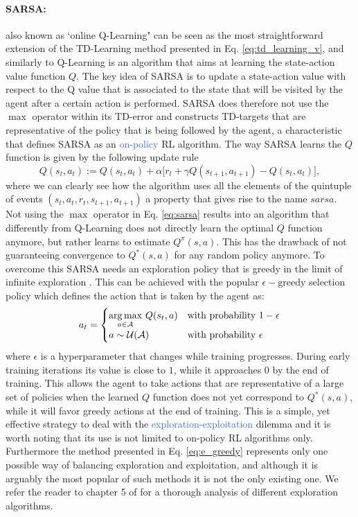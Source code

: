\paragraph{SARSA:} also known as `online Q-Learning" \cite{rummery1994line} can be seen as the most straightforward extension of the TD-Learning method presented in Eq. \ref{eq:td_learning_v}, and similarly to Q-Learning is an algorithm that aims at learning the state-action value function $Q$. The key idea of SARSA is to update a state-action value with respect to the Q value that is associated to the state that will be visited by the agent after a certain action is performed. SARSA does therefore not use the $\max$ operator within its TD-error and constructs TD-targets that are representative of the policy that is being followed by the agent, a characteristic that defines SARSA as an \textcolor{RoyalBlue}{on-policy} RL algorithm. The way SARSA learns the $Q$ function is given by the following update rule
\begin{equation}
	Q(s_t,a_t):=Q(s_t,a_t) + \alpha\big[r_t + \gamma Q(s_{t+1},a_{t+1}) - Q(s_t, a_t) \big], 
	\label{eq:sarsa}
\end{equation}
where we can clearly see how the algorithm uses all the elements of the quintuple of events $(s_t, a_t, r_t, s_{t+1}, a_{t+1})$ a property that gives rise to the name $sarsa$. Not using the $\max$ operator in Eq. \ref{eq:sarsa} results into an algorithm that differently from Q-Learning does not directly learn the optimal $Q$ function anymore, but rather learns to estimate $Q^{\pi}(s,a)$. This has the drawback of not guaranteeing convergence to $Q^{*}(s,a)$ for any random policy anymore. To overcome this SARSA needs an exploration policy that is greedy in the limit of infinite exploration \cite{singh2000convergence}. This can be achieved with the popular $\epsilon-\text{greedy}$ selection policy which defines the action that is taken by the agent as:
\begin{equation}
a_t = \begin{cases}
\underset{a\in\mathcal{A}}{\operatorname*{arg\,max}} \ Q(s_t,a) &\text{with probability $1-\epsilon$}\\
a \sim \mathcal{U}(\mathcal{A}) &\text{with probability $\epsilon$}
\end{cases}
\label{eq:e_greedy}
\end{equation}
where $\epsilon$ is a hyperparameter that changes while training progresses. During early training iterations its value is close to $1$, while it approaches $0$ by the end of training. This allows the agent to take actions that are representative of a large set of policies when the learned $Q$ function does not yet correspond to $Q^{*}(s,a)$, while it will favor greedy actions at the end of training. This is a simple, yet effective strategy to deal with the \textcolor{RoyalBlue}{exploration-exploitation} dilemma and it is worth noting that its use is not limited to on-policy RL algorithms only. Furthermore the method presented in Eq. \ref{eq:e_greedy} represents only one possible way of balancing exploration and exploitation, and although it is arguably the most popular of such methods it is not the only existing one. We refer the reader to chapter 5 of \cite{wiering1999explorations} for a thorough analysis of different exploration algorithms.


